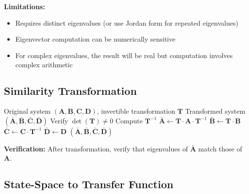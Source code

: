 \textbf{Limitations:}
\begin{itemize}
    \item Requires distinct eigenvalues (or use Jordan form for repeated eigenvalues)
    \item Eigenvector computation can be numerically sensitive
    \item For complex eigenvalues, the result will be real but computation involves complex arithmetic
\end{itemize}

\subsection{Similarity Transformation}

\begin{algorithm}[H]
\caption{Apply Similarity Transformation}
\label{alg:similarity}
\begin{algorithmic}[1]
\REQUIRE Original system $(\mathbf{A}, \mathbf{B}, \mathbf{C}, \mathbf{D})$, invertible transformation $\mathbf{T}$
\ENSURE Transformed system $(\bar{\mathbf{A}}, \bar{\mathbf{B}}, \bar{\mathbf{C}}, \bar{\mathbf{D}})$
\STATE Verify $\det(\mathbf{T}) \neq 0$ 
\STATE Compute $\mathbf{T}^{-1}$
\STATE
\STATE $\bar{\mathbf{A}} \gets \mathbf{T} \cdot \mathbf{A} \cdot \mathbf{T}^{-1}$
\STATE $\bar{\mathbf{B}} \gets \mathbf{T} \cdot \mathbf{B}$
\STATE $\bar{\mathbf{C}} \gets \mathbf{C} \cdot \mathbf{T}^{-1}$
\STATE $\bar{\mathbf{D}} \gets \mathbf{D}$ 
\STATE
\RETURN $(\bar{\mathbf{A}}, \bar{\mathbf{B}}, \bar{\mathbf{C}}, \bar{\mathbf{D}})$
\end{algorithmic}
\end{algorithm}

\textbf{Verification:} After transformation, verify that eigenvalues of $\bar{\mathbf{A}}$ match those of $\mathbf{A}$.

\subsection{State-Space to Transfer Function}

